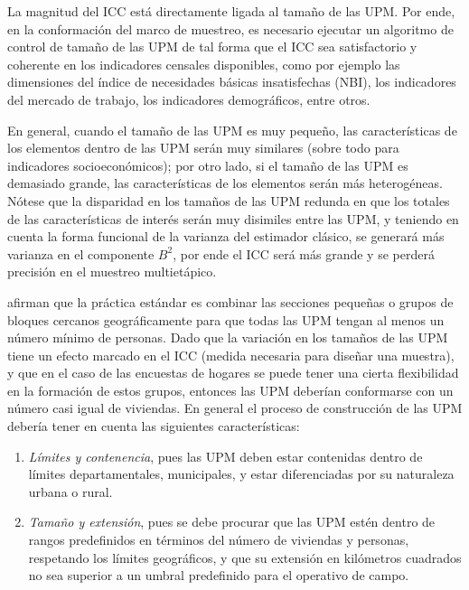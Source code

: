 \documentclass[
  12pt,
  spanish,
]{book}
\providecommand{\tightlist}{%
  \setlength{\itemsep}{0pt}\setlength{\parskip}{0pt}}
\begin{document}
La magnitud del ICC está directamente ligada al tamaño de las UPM. Por ende, en la conformación del marco de muestreo, es necesario ejecutar un algoritmo de control de tamaño de las UPM de tal forma que el ICC sea satisfactorio y coherente en los indicadores censales disponibles, como por ejemplo las dimensiones del índice de necesidades básicas insatisfechas (NBI), los indicadores del mercado de trabajo, los indicadores demográficos, entre otros.

En general, cuando el tamaño de las UPM es muy pequeño, las características de los elementos dentro de las UPM serán muy similares (sobre todo para indicadores socioeconómicos); por otro lado, si el tamaño de las UPM es demasiado grande, las características de los elementos serán más heterogéneas. Nótese que la disparidad en los tamaños de las UPM redunda en que los totales de las características de interés serán muy disimiles entre las UPM, y teniendo en cuenta la forma funcional de la varianza del estimador clásico, se generará más varianza en el componente \(B^2\), por ende el ICC será más grande y se perderá precisión en el muestreo multietápico.

\citet{Valliant_Dever_Kreuter_2013} afirman que la práctica estándar es combinar las secciones pequeñas o grupos de bloques cercanos geográficamente para que todas las UPM tengan al menos un número mínimo de personas. Dado que la variación en los tamaños de las UPM tiene un efecto marcado en el ICC (medida necesaria para diseñar una muestra), y que en el caso de las encuestas de hogares se puede tener una cierta flexibilidad en la formación de estos grupos, entonces las UPM deberían conformarse con un número casi igual de viviendas. En general el proceso de construcción de las UPM debería tener en cuenta las siguientes características:

\begin{enumerate}
\def\labelenumi{\arabic{enumi}.}
\tightlist
\item
  \emph{Límites y contenencia}, pues las UPM deben estar contenidas dentro de límites departamentales, municipales, y estar diferenciadas por su naturaleza urbana o rural.
\item
  \emph{Tamaño y extensión}, pues se debe procurar que las UPM estén dentro de rangos predefinidos en términos del número de viviendas y personas, respetando los límites geográficos, y que su extensión en kilómetros cuadrados no sea superior a un umbral predefinido para el operativo de campo.
\end{enumerate}
\end{document}
